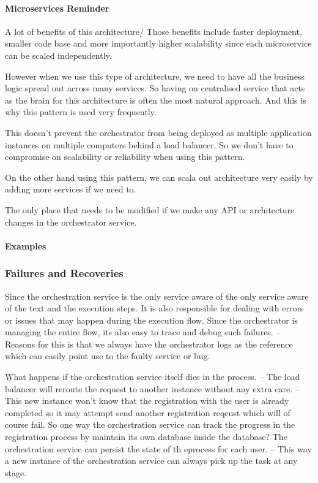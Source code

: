 \documentclass[a4paper, 11pt]{book}
\begin{document}
    \paragraph{Microservices Reminder}
    A lot of benefits of this architecture/
    Those benefits include faster deployment, smaller code base and more importantly higher scalability since each microservice can be scaled independently.

    However when we use this type of architecture, we need to have all the business logic spread out across many services.
    So having on centralised service that acts as the brain for this architecture is often the most natural approach.
    And this is why this pattern is used very frequently.

    This doesn't prevent the orchestrator from being deployed as multiple application instances on multiple computers behind a load balancer.
    So we don't have to compromise on scalability or reliability when using this pattern.

    On the other hand using this pattern, we can scala out architecture very easily by adding more services if we need to.

    The only place that needs to be modified if we make any API or architecture changes in the orchestrator service.

    \paragraph{Examples}

    \subsubsection{Failures and Recoveries}
    Since the orchestration service is the only service aware of the only service aware of the text and the execution steps.
    It is also responsible for dealing with errors or issues that may happen during the execution flow.
    Since the orchestrator is managing the entire flow, its also easy to trace and debug such failures.
    -- Reasons for this is that we always have the orchestrator logs as the reference which can easily point use to the faulty service or bug.

    What happens if the orchestration service itself dies in the process.
    -- The load balancer will reroute the request to another instance without any extra care.
    -- This new instance won't know that the registration with the user is already completed so it may attempt send another registration reqeust which will of course fail.
    So one way the orchestration service can track the progress in the registration process by maintain its own database inside the database?
    The orchestration service can persist the state of th eprocess for each user.
    -- This way a new instance of the orchestration service can always pick up the task at any stage.
\end{document}
